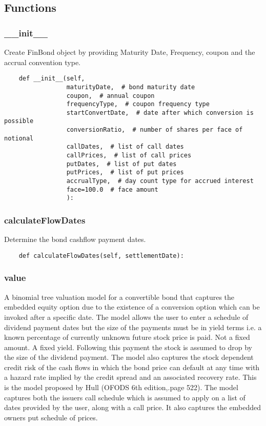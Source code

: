 \documentclass[twoside,11pt]{book}
\begin{document}
\subsection*{Functions}

\subsubsection*{{\bf \_\_init\_\_}}
Create FinBond object by providing Maturity Date, Frequency, coupon and the accrual convention type.  

\begin{lstlisting}
    def __init__(self,
                 maturityDate,  # bond maturity date
                 coupon,  # annual coupon
                 frequencyType,  # coupon frequency type
                 startConvertDate,  # date after which conversion is possible
                 conversionRatio,  # number of shares per face of notional
                 callDates,  # list of call dates
                 callPrices,  # list of call prices
                 putDates,  # list of put dates
                 putPrices,  # list of put prices
                 accrualType,  # day count type for accrued interest
                 face=100.0  # face amount
                 ):
\end{lstlisting}

\subsubsection*{{\bf calculateFlowDates}}
Determine the bond cashflow payment dates.  

\begin{lstlisting}
    def calculateFlowDates(self, settlementDate):
\end{lstlisting}

\subsubsection*{{\bf value}}
 A binomial tree valuation model for a convertible bond that captures the embedded equity option due to the existence of a conversion option which can be invoked after a specific date.  The model allows the user to enter a schedule of dividend payment dates but the size of the payments must be in yield terms i.e. a known percentage of currently unknown future stock price is paid. Not a fixed amount. A fixed yield. Following this payment the stock is assumed to drop by the size of the dividend payment.  The model also captures the stock dependent credit risk of the cash flows in which the bond price can default at any time with a hazard rate implied by the credit spread and an associated recovery rate. This is the model proposed by Hull (OFODS 6th edition,.page 522).  The model captures both the issuers call schedule which is assumed to apply on a list of dates provided by the user, along with a call price. It also captures the embedded owners put schedule of prices.  
\end{document}
